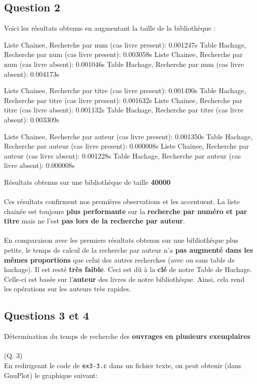 \documentclass[12pt]{extarticle}
\begin{document}
\subsection*{Question 2}
Voici les résultats obtenus en augmentant la taille de la bibliothèque :
\begin{bashcode}
Liste Chainee, Recherche par num (cas livre present): 0.001247s
Table Hachage, Recherche par num (cas livre present): 0.003058s
Liste Chainee, Recherche par num (cas livre absent): 0.001046s
Table Hachage, Recherche par num (cas livre absent): 0.004173s

Liste Chainee, Recherche par titre (cas livre present): 0.001490s
Table Hachage, Recherche par titre (cas livre present): 0.001632s
Liste Chainee, Recherche par titre (cas livre absent): 0.001132s
Table Hachage, Recherche par titre (cas livre absent): 0.003309s

Liste Chainee, Recherche par auteur (cas livre present): 0.001350s
Table Hachage, Recherche par auteur (cas livre present): 0.000008s
Liste Chainee, Recherche par auteur (cas livre absent): 0.001228s
Table Hachage, Recherche par auteur (cas livre absent): 0.000008s
\end{bashcode} 
{\small Résultats obtenus sur une bibliothèque de taille \textbf{40000}} \\ \\
Ces résultats confirment nos premières observations et les accentuent. La liste chainée est toujours \textbf{plus performante} sur la \textbf{recherche par numéro et par titre} mais ne l'est \textbf{pas lors de la recherche par auteur}. \\ \\
En comparaison avec les premiers résultats obtenus sur une bibliothèque plus petite, le temps de calcul de la recherche par auteur n'a \textbf{pas augmenté dans les mêmes proportions} que celui des autres recherches (avec ou sans table de hachage). Il est resté \textbf{très faible}. Ceci est dû à la \textbf{clé} de notre Table de Hachage. Celle-ci est basée sur l'\textbf{auteur} des livres de notre bibliothèque. Ainsi, cela rend les opérations sur les auteurs très rapides.
\\
\subsection*{Questions 3 et 4}
Détermination du temps de recherche des \textbf{ouvrages en plusieurs exemplaires}\\ \\
{\small (Q. 3)}\\
En redirigeant le code de \texttt{ex3-3.c} dans un fichier texte, on peut obtenir (dans GnuPlot) le graphique suivant: 
\end{document}
